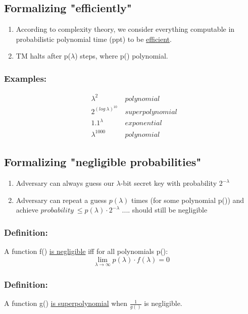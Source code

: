 \documentclass{report}
\begin{document}
\subsection*{Formalizing "efficiently"}
\begin{enumerate}[$\bullet$]
	\item According to complexity theory, we consider everything computable in probabilistic polynomial time (ppt) to be \underline{efficient}. \\
	\item TM halts after p($\lambda$) steps, where p(\textbullet) polynomial.
\end{enumerate}
\subsubsection*{Examples:}
\begin{align*}
	& \lambda^2 \ & polynomial \\
	& 2^{(log \ \lambda)^{10}} \ & superpolynomial \\
	& 1.1^{\lambda} \ & exponential \\
	& \lambda^{1000} \ & polynomial
\end{align*}
\subsection*{Formalizing "negligible probabilities"}
\begin{enumerate}[\textbullet]
	\item Adversary can always guess our $\lambda$-bit secret key with probability $2^{-\lambda}$
	\item Adversary can repeat a guess $p(\lambda)$ times (for some polynomial p(\textbullet)) and achieve $probability \ \leq p(\lambda) \cdot 2^{-\lambda}$ .... should still be negligible
\end{enumerate}
\subsubsection*{Definition:}
A function f() \underline{is negligible} iff for all polynomials p(\textbullet):
\[
	\lim_{\lambda \rightarrow \infty} p(\lambda) \cdot f(\lambda) = 0
\]
\subsubsection*{Definition:}
A function g() \underline{is superpolynomial} when $\frac{1}{g()}$ is negligible.
\end{document}
